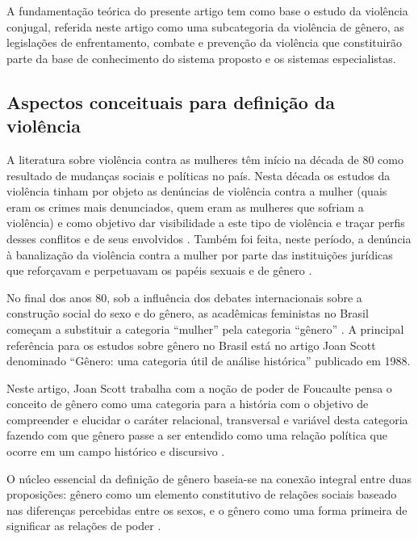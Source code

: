 \documentclass[12pt]{article}
\begin{document}
A fundamentação teórica do presente artigo tem como base o estudo da violência conjugal, referida neste artigo como uma subcategoria da violência de gênero, as legislações de enfrentamento, combate e prevenção da violência que constituirão parte da base de conhecimento do sistema proposto e os sistemas especialistas.

\subsection{Aspectos conceituais para definição da violência} 

A literatura sobre violência contra as mulheres têm início na década de 80 como resultado de mudanças sociais e políticas no país. Nesta década os estudos da violência tinham por objeto as denúncias de violência contra a mulher (quais eram os crimes mais denunciados, quem eram as mulheres que sofriam a violência) e como objetivo dar visibilidade a este tipo de violência e traçar perfis desses conflitos e de seus envolvidos \cite{santos2005}. Também foi feita, neste período, a denúncia à banalização da violência contra a mulher por parte das instituições jurídicas que reforçavam e perpetuavam os papéis sexuais e de gênero \cite{stuker2016}.

No final dos anos 80, sob a influência dos debates internacionais sobre a construção social do sexo e do gênero, as acadêmicas feministas no Brasil começam a substituir a categoria ``mulher'' pela categoria ``gênero'' \cite{santos2005}. A principal referência para os estudos sobre gênero no Brasil está no artigo Joan Scott denominado ``Gênero: uma categoria útil de análise histórica'' publicado em 1988. 

Neste artigo, Joan Scott trabalha com a noção de poder de Foucault\footnotemark[1] e pensa o conceito de gênero como uma categoria para a história com o objetivo de compreender e elucidar o caráter relacional, transversal e variável desta categoria fazendo com que gênero passe a ser entendido como uma relação política que ocorre em um campo histórico e discursivo \cite{maia2012}.


O núcleo essencial da definição de gênero baseia-se na conexão integral entre duas proposições: gênero como um elemento constitutivo de relações sociais baseado nas diferenças percebidas entre os sexos, e o gênero como uma forma primeira de significar as relações de poder \cite{Scott1989}. 
\end{document}
